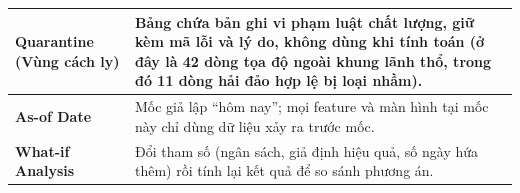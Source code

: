 \begin{xltabular}{\textwidth}{|>{\raggedright\arraybackslash}m{4cm}|L|}
\hline
\textbf{Quarantine (Vùng cách ly)} & Bảng chứa bản ghi vi phạm luật chất lượng, giữ kèm mã lỗi và lý do, không dùng khi tính toán (ở đây là 42 dòng tọa độ ngoài khung lãnh thổ, trong đó 11 dòng hải đảo hợp lệ bị loại nhầm). \\
\hline
\textbf{As-of Date} & Mốc giả lập ``hôm nay''; mọi feature và màn hình tại mốc này chỉ dùng dữ liệu xảy ra trước mốc. \\
\hline
\textbf{What-if Analysis} & Đổi tham số (ngân sách, giả định hiệu quả, số ngày hứa thêm) rồi tính lại kết quả để so sánh phương án. \\
\hline
\end{xltabular}
